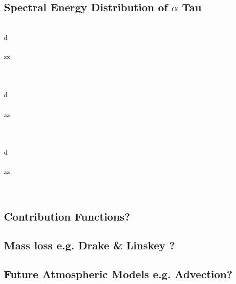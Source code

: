 \documentclass[iop]{emulateapj}
\begin{document}
\subsection{Spectral Energy Distribution of $\alpha$ Tau} \label{disc2}
\\
d
\\
\\
zz
\\
\\
\\
\\
d
\\
\\
zz
\\
\\
\\
\\
d
\\
\\
zz
\\
\\
\\
\subsection{Contribution Functions?} \label{disc3}
\subsection{Mass loss e.g. Drake & Linskey ?} \label{disc4}
\subsection{Future Atmospheric Models e.g. Advection?} \label{disc5}
\end{document}
